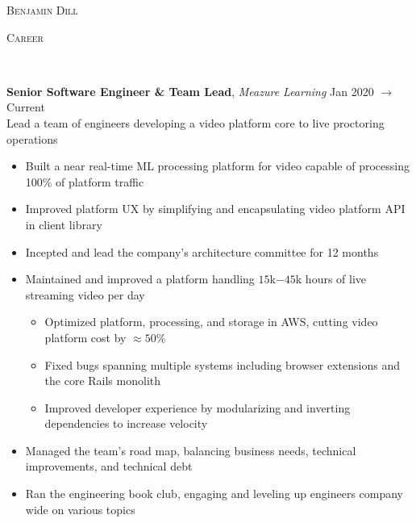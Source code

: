 \documentclass[9pt]{article}
\newenvironment{changemargin}[2]{%
  \begin{list}{}{%
      \setlength{\topsep}{0pt}%
      \setlength{\leftmargin}{#1}%
      \setlength{\rightmargin}{#2}%
      \setlength{\listparindent}{\parindent}%
      \setlength{\itemindent}{\parindent}%
      \setlength{\parsep}{\parskip}%
    }%
  \item[]}{\end{list}
}
\newcommand{\lineover}{
  \begin{changemargin}{-0.05in}{-0.05in}
    \vspace*{-8pt}
    \hrulefill{} \\
    \vspace*{-2pt}
  \end{changemargin}
}
\newcommand{\header}[1]{
  \begin{changemargin}{-0.5in}{-0.5in}
    \scshape{#1}\\
    \lineover{}
  \end{changemargin}
}
\newcommand{\contact}[3]{
  \begin{changemargin}{-0.5in}{-0.5in}
    \begin{center}
      {\faUser{} \hspace{1px} \Large \scshape {#1}}
      \hspace*{\fill}
      {\faPhone{} \hspace{1px}{#2}}
      \hspace*{\fill}
          {\faEnvelope{} \hspace{1px}{#3}}
    \end{center}
  \end{changemargin}
}
\newenvironment{body} {
  \vspace*{-16pt}
  \begin{changemargin}{-0.25in}{-0.5in}
  }	
  {\end{changemargin}
}
\begin{document}
\contact{Benjamin Dill}
        {\href{\phonelink}{\phonestring}}
        {\href{mailto:\jobmail}{\jobmail}}

% 
% 


\header{Career}

\begin{body}
  \vspace{17pt}
  \textbf{Senior Software Engineer \& Team Lead}, \emph{Meazure Learning} \hfill Jan 2020 $\to$ Current \\
  \vspace{3pt}
  Lead a team of engineers developing a video platform core to live proctoring operations
  \begin{itemize} \itemsep=-0pt
  \item Built a near real-time ML processing platform for video capable of processing 100\% of platform traffic
  \item Improved platform UX by simplifying and encapsulating video platform API in client library
  \item Incepted and lead the company's architecture committee for 12 months
  \item Maintained and improved a platform handling $15$k$-45$k hours of live streaming video per day
    \begin{itemize} \itemsep=-0pt
    \item Optimized platform, processing, and storage in AWS, cutting video platform cost by $\approx 50\%$
    \item Fixed bugs spanning multiple systems including browser extensions and the core Rails monolith
    \item Improved developer experience by modularizing and inverting dependencies to increase velocity
    \end{itemize}
  \item Managed the team's road map, balancing business needs, technical improvements, and technical debt
  \item Ran the engineering book club, engaging and leveling up engineers company wide on various topics

\end{itemize}
\end{body}
\end{document}
